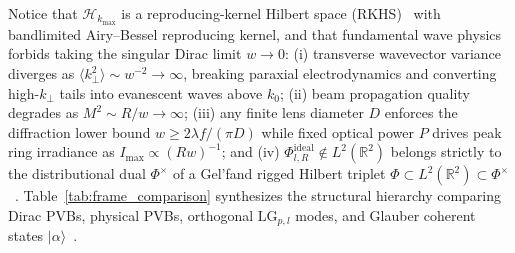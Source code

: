 \documentclass[aps,pra,reprint,nofootinbib,floatfix,longbibliography]{revtex4-2}
\theoremstyle{remark}
\newcommand{\ket}[1]{| #1 \rangle}
\begin{document}
Notice that $\mathcal{H}_{k_{\max}}$ is a reproducing-kernel Hilbert space (RKHS)~\cite{PaulsenRaghupathi2016} with bandlimited Airy--Bessel reproducing kernel, and that fundamental wave physics forbids taking the singular Dirac limit $w \to 0$: (i) transverse wavevector variance diverges as $\langle k_\perp^2 \rangle \sim w^{-2} \to \infty$, breaking paraxial electrodynamics and converting high-$k_\perp$ tails into evanescent waves above $k_0$; (ii) beam propagation quality degrades as $M^2 \sim R/w \to \infty$; (iii) any finite lens diameter $D$ enforces the diffraction lower bound $w \ge 2\lambda f/(\pi D)$ while fixed optical power $P$ drives peak ring irradiance as $I_{\max} \propto (R w)^{-1}$; and (iv) $\Phi_{l,R}^{\mathrm{ideal}} \notin L^2(\mathbb{R}^2)$ belongs strictly to the distributional dual $\Phi^\times$ of a Gel'fand rigged Hilbert triplet $\Phi \subset L^2(\mathbb{R}^2) \subset \Phi^\times$~\cite{Gelfand1964}. Table~\ref{tab:frame_comparison} synthesizes the structural hierarchy comparing Dirac PVBs, physical PVBs, orthogonal $\mathrm{LG}_{p,l}$ modes, and Glauber coherent states $\ket{\alpha}$~\cite{Klauder1985,Perelomov1986,Gazeau2009}.
\end{document}
